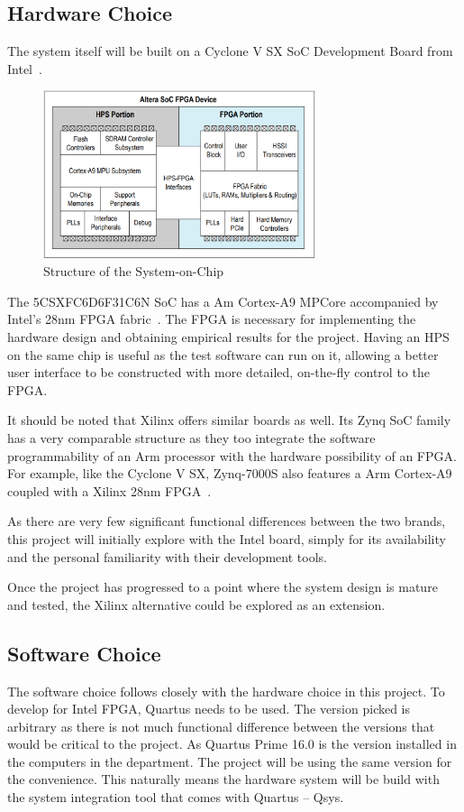 \documentclass[journal]{IEEEtran}
\begin{document}
\subsection{Hardware Choice}
The system itself will be built on a Cyclone V SX SoC Development Board from
Intel~\cite{Intel1}.

\begin{figure}[H]
  \centering
  \includegraphics[width=8cm]{img/SoCStructure}
  \caption{Structure of the System-on-Chip}
  \label{SoCStructure}
\end{figure}

The 5CSXFC6D6F31C6N SoC has a Am Cortex-A9 MPCore accompanied by Intel's 28nm
FPGA fabric~\cite{Altera1}.
The FPGA is necessary for implementing the hardware design and obtaining
empirical results for the project.
Having an HPS on the same chip is useful as the test software can run on it,
allowing a better user interface to be constructed with more detailed,
on-the-fly control to the FPGA.

It should be noted that Xilinx offers similar boards as well. Its Zynq SoC
family has a very comparable structure as they too integrate the software
programmability of an Arm processor with the hardware possibility of an FPGA.
For example, like the Cyclone V SX, Zynq-7000S also features a Arm Cortex-A9
coupled with a Xilinx 28nm FPGA~\cite{Xilinx1}.

As there are very few significant functional differences between the two brands,
this project will initially explore with the Intel board, simply for its
availability and the personal familiarity with their development tools.

Once the project has progressed to a point where the system design is mature and
tested, the Xilinx alternative could be explored as an extension.

\subsection{Software Choice}
The software choice follows closely with the hardware choice in this project.
To develop for Intel FPGA, Quartus needs to be used.
The version picked is arbitrary as there is not much functional difference
between the versions that would be critical to the project.
As Quartus Prime 16.0 is the version installed in the computers in the
department.
The project will be using the same version for the convenience.
This naturally means the hardware system will be build with the system
integration tool that comes with Quartus -- Qsys.
\end{document}
